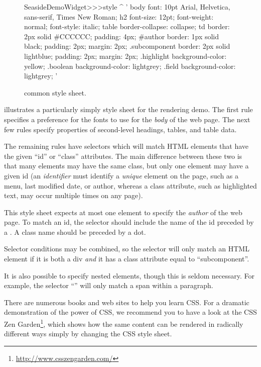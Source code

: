 \documentclass[a4paper,10pt,twoside]{book}
\begin{document}
\begin{figure}[tb]
\begin{code}{}
SeasideDemoWidget>>>style
	^ '
body {
	font: 10pt Arial, Helvetica, sans-serif, Times New Roman;
}
h2 {
	font-size: 12pt;
	font-weight: normal;
	font-style: italic;
}
table { border-collapse: collapse; }
td {
	border: 2px solid #CCCCCC;
	padding: 4px;
}
#author {
	border: 1px solid black;
	padding: 2px;
	margin: 2px;
}
.subcomponent {
	border: 2px solid lightblue;
	padding: 2px;
	margin: 2px;
}
.highlight { background-color: yellow; }
.boolean { background-color: lightgrey; }
.field { background-color: lightgrey; }
'
\end{code}
\caption{ common style sheet.
\label{fig:democss}}
\end{figure}
 illustrates a particularly simply style sheet for the rendering demo.
The first rule specifies a preference for the fonts to use for the \emph{body} of the web page.
The next few rules specify properties of second-level headings, tables, and table data.

The remaining rules have selectors which will match HTML elements that have the given ``id'' or ``class'' attributes.
The main difference between these two is that many elements may have the same class, but only one element may have a given id (\ie an \emph{identifier} must identify a \emph{unique} element on the page, such as a menu, last modified date, or author, whereas a class attribute, such as highlighted text, may occur multiple times on any page).

This style sheet expects at most one element to specify the \emph{author} of the web page.
To match an id, the selector should include the name of the id preceded by a \ct{#}.
A class name should be preceded by a dot.

Selector conditions may be combined, so the selector  will only match an HTML element if it is both a div \emph{and} it has a class attribute equal to ``subcomponent''.

It is also possible to specify nested elements, though this is seldom necessary.
For example, the selector ``'' will only match a span within a paragraph.

There are numerous books and web sites to help you learn CSS.
For a dramatic demonstration of the power of CSS, we recommend you to have a look at the CSS Zen Garden\footnote{\url{http://www.csszengarden.com/}}, which shows how the same content can be rendered in radically different ways simply by changing the CSS style sheet.
\end{document}
